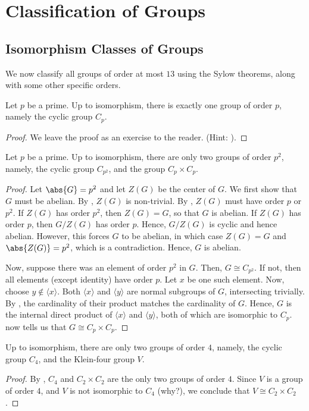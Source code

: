 \section{Classification of Groups}

\subsection{Isomorphism Classes of Groups}

We now classify all groups of order at most $13$ using the Sylow theorems, along with some other specific orders.

\begin{prop}
    Let $p$ be a prime. Up to isomorphism, there is exactly one group of order $p$, namely the cyclic group $C_p$.
\end{prop}
\begin{proof}
    We leave the proof as an exercise to the reader. (Hint: ). 
\end{proof}

\begin{theorem} \label{thm:class-prime-square}
    Let $p$ be a prime. Up to isomorphism, there are only two groups of order $p^2$, namely, the cyclic group $C_{p^2}$, and the group $C_p \times C_p$. 
\end{theorem}
\begin{proof}
    Let $\abs{G} = p^2$ and let $Z(G)$ be the center of $G$. We first show that $G$ must be abelian. By , $Z(G)$ is non-trivial. By , $Z(G)$ must have order $p$ or $p^2$. If $Z(G)$ has order $p^2$, then $Z(G) = G$, so that $G$ is abelian. If $Z(G)$ has order $p$, then $G/Z(G)$ has order $p$. Hence, $G/Z(G)$ is cyclic and hence abelian. However, this forces $G$ to be abelian, in which case $Z(G) = G$ and $\abs{Z(G)} = p^2$, which is a contradiction. Hence, $G$ is abelian. 
    
    Now, suppose there was an element of order $p^2$ in $G$. Then, $G \cong C_{p^2}$. If not, then all elements (except identity) have order $p$. Let $x$ be one such element. Now, choose $y \notin \langle x \rangle$. Both $\langle x \rangle$ and $\langle y \rangle$ are normal subgroups of $G$, intersecting trivially. By , the cardinality of their product matches the cardinality of $G$. Hence, $G$ is the internal direct product of $\langle x \rangle$ and $\langle y \rangle$, both of which are isomorphic to $C_p$.  now tells us that $G \cong C_p \times C_p$.
\end{proof}
\begin{cor} \label{cor:class-4}
    Up to isomorphism, there are only two groups of order $4$, namely, the cyclic group $C_4$, and the Klein-four group $V$. 
\end{cor}
\begin{proof}
    By , $C_4$ and $C_2 \times C_2$ are the only two groups of order $4$. Since $V$ is a group of order $4$, and $V$ is not isomorphic to $C_4$ (why?), we conclude that $V \cong C_2 \times C_2$. 
\end{proof}

